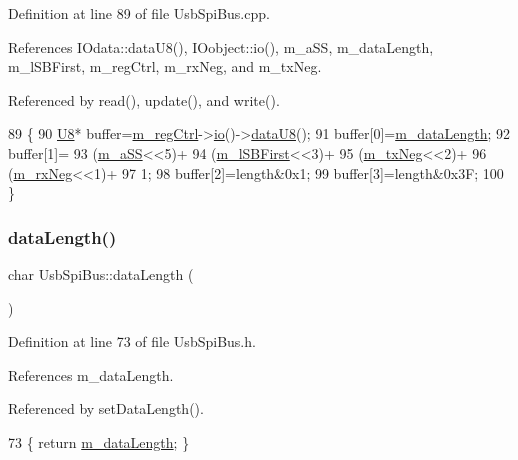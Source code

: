 Definition at line 89 of file Usb\+Spi\+Bus.\+cpp.



References I\+Odata\+::data\+U8(), I\+Oobject\+::io(), m\+\_\+a\+SS, m\+\_\+data\+Length, m\+\_\+l\+S\+B\+First, m\+\_\+reg\+Ctrl, m\+\_\+rx\+Neg, and m\+\_\+tx\+Neg.



Referenced by read(), update(), and write().


\begin{DoxyCode}
89                                 \{
90   \hyperlink{ICECALv3_8h_a3cb25ca6f51f003950f9625ff05536fc}{U8}* buffer=\hyperlink{classUsbSpiBus_abcd2ac59f2bb4ea5b97ff98f2b7659da}{m\_regCtrl}->\hyperlink{classIOobject_af04fb94137c3d86849f478ac5afab5d1}{io}()->\hyperlink{classIOdata_a75e9c318dbac3a39402179070943d4bc}{dataU8}();
91   buffer[0]=\hyperlink{classUsbSpiBus_a2d8b2bddd6d4d5dc53c38b5698737c5c}{m\_dataLength};
92   buffer[1]=
93     (\hyperlink{classUsbSpiBus_ac98d088ac8aed042f65cbd918fc538ae}{m\_aSS}<<5)+
94     (\hyperlink{classUsbSpiBus_a23011787b0425356b011bc7a1c7cff5b}{m\_lSBFirst}<<3)+
95     (\hyperlink{classUsbSpiBus_a48528e7dcb036ecc1732581a89e16d10}{m\_txNeg}<<2)+
96     (\hyperlink{classUsbSpiBus_abf36f2df24c3ec5363efe73c9771bbc8}{m\_rxNeg}<<1)+
97     1;
98   buffer[2]=length&0x1;
99   buffer[3]=length&0x3F;  
100 \}
\end{DoxyCode}
\mbox{\label{classUsbSpiBus_ae7d38b275b5267f795b2d9f1d561d688}} 
\subsubsection{\texorpdfstring{data\+Length()}{dataLength()}}
{\footnotesize\ttfamily char Usb\+Spi\+Bus\+::data\+Length (\begin{DoxyParamCaption}{ }\end{DoxyParamCaption})\hspace{0.3cm}{\ttfamily [inline]}}



Definition at line 73 of file Usb\+Spi\+Bus.\+h.



References m\+\_\+data\+Length.



Referenced by set\+Data\+Length().


\begin{DoxyCode}
73 \{ \textcolor{keywordflow}{return} \hyperlink{classUsbSpiBus_a2d8b2bddd6d4d5dc53c38b5698737c5c}{m\_dataLength}; \}
\end{DoxyCode}
\mbox{\label{classObject_aac010553f022165573714b7014a15f0d}} 
